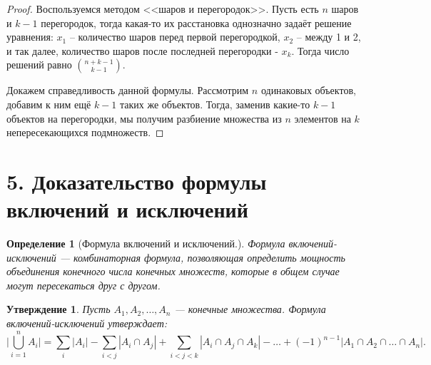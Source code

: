 \documentclass[a4paper,12pt]{article}
\newtheorem*{defin}{Определение}
\newtheorem*{state}{Утверждение}
\begin{document}
    \begin{proof}
        \par Воспользуемся методом <<шаров и перегородок>>. Пусть есть $n$ шаров и
        $k-1$ перегородок, тогда какая-то их расстановка однозначно задаёт
        решение уравнения: $x_1$ --  количество шаров перед первой
        перегородкой, $x_2$ -- между 1 и 2, и так далее, количество шаров после
        последней перегородки - $x_k$. Тогда число решений равно ${n+k-1
        \choose k-1}$.
        \par Докажем справедливость данной формулы. Рассмотрим $n$ одинаковых
        объектов, добавим к ним ещё $k-1$ таких же объектов. Тогда, заменив
        какие-то $k-1$ объектов на перегородки, мы получим разбиение множества
        из $n$ элементов на $k$ непересекающихся подмножеств.
    \end{proof}
	

	
 	\section*{5. Доказательство формулы включений и исключений}
 	\begin{defin} [Формула включений и исключений.] Формула включений-исключений — комбинаторная формула, позволяющая определить мощность объединения конечного числа конечных множеств, которые в общем случае могут пересекаться друг с другом.
 	\end{defin}
 	\begin{state}
		Пусть $ A_{1}, A_{2},\ldots , A_{n} $ — конечные множества. Формула включений-исключений утверждает:
		$$\biggl | \bigcup_{i=1}^{n}A_i \biggl | =
		 \sum_{i} | A_i | - \sum_{i<j} | A_i \cap A_j | + \sum_{i<j<k} | A_i \cap A_j \cap A_k | - \ldots + (-1)^{n-1} | A_1 \cap A_2 \cap \ldots \cap A_n |.$$
 	\end{state}
\end{document}
